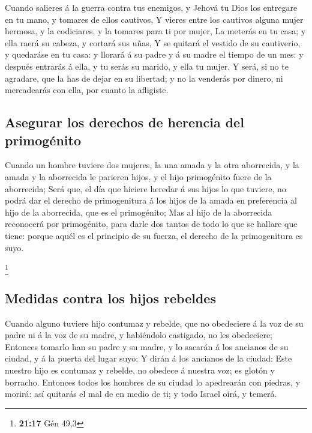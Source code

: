  Cuando salieres á la guerra contra tus enemigos, y
Jehová tu Dios los entregare en tu mano, y tomares de ellos cautivos,
 Y vieres entre los cautivos alguna mujer hermosa, y la
codiciares, y la tomares para ti por mujer,  La meterás
en tu casa; y ella raerá su cabeza, y cortará sus uñas, 
Y se quitará el vestido de su cautiverio, y quedaráse en tu casa: y
llorará á su padre y á su madre el tiempo de un mes: y después entrarás
á ella, y tu serás su marido, y ella tu mujer.  Y será,
si no te agradare, que la has de dejar en su libertad; y no la venderás
por dinero, ni mercadearás con ella, por cuanto la afligiste.

\hypertarget{asegurar-los-derechos-de-herencia-del-primoguxe9nito}{%
\subsection{Asegurar los derechos de herencia del
primogénito}\label{asegurar-los-derechos-de-herencia-del-primoguxe9nito}}

 Cuando un hombre tuviere dos mujeres, la una amada y la
otra aborrecida, y la amada y la aborrecida le parieren hijos, y el hijo
primogénito fuere de la aborrecida;  Será que, el día que
hiciere heredar á sus hijos lo que tuviere, no podrá dar el derecho de
primogenitura á los hijos de la amada en preferencia al hijo de la
aborrecida, que es el primogénito;  Mas al hijo de la
aborrecida reconocerá por primogénito, para darle dos tantos de todo lo
que se hallare que tiene: porque aquél es el principio de su fuerza, el
derecho de la primogenitura es suyo.

\footnote{\textbf{21:17} Gén 49,3}

\hypertarget{medidas-contra-los-hijos-rebeldes}{%
\subsection{Medidas contra los hijos
rebeldes}\label{medidas-contra-los-hijos-rebeldes}}

 Cuando alguno tuviere hijo contumaz y rebelde, que no
obedeciere á la voz de su padre ni á la voz de su madre, y habiéndolo
castigado, no les obedeciere;  Entonces tomarlo han su
padre y su madre, y lo sacarán á los ancianos de su ciudad, y á la
puerta del lugar suyo;  Y dirán á los ancianos de la
ciudad: Este nuestro hijo es contumaz y rebelde, no obedece á nuestra
voz; es glotón y borracho.  Entonces todos los hombres de
su ciudad lo apedrearán con piedras, y morirá: así quitarás el mal de en
medio de ti; y todo Israel oirá, y temerá.

